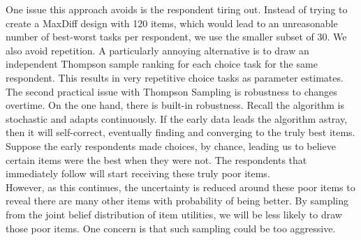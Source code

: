 \documentclass[nonblindrev]{informs3}
\begin{document}
One issue this approach avoids is the respondent tiring out. Instead of trying to create a MaxDiff design with 120 items, which would lead to an unreasonable number of best-worst tasks per respondent, we use the smaller subset of 30.  We also avoid repetition. A particularly annoying alternative is to draw an independent Thompson sample ranking for each choice task for the same respondent. This results in very repetitive choice tasks as parameter estimates. \\
The second practical issue with Thompson Sampling is robustness to changes overtime. On the one hand, there is built-in robustness. Recall the algorithm is stochastic and adapts continuously. If the early data leads the algorithm astray, then it will self-correct, eventually finding and converging to the truly best items. Suppose the early respondents made choices, by chance, leading us to believe certain items were the best when they were not. The respondents that immediately follow will start receiving these truly poor items. \\
However, as this continues, the uncertainty is reduced around these poor items to reveal there are many other items with probability of being better. By sampling from the joint belief distribution of item utilities, we will be less likely to draw those poor items. One concern is that such sampling could be too aggressive.\\
\end{document}
